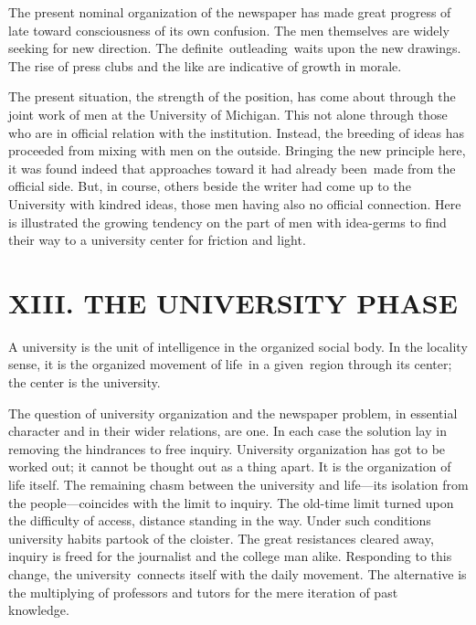 \documentclass[twoside,symmetric,nobib,justified]{tufte-book}
\begin{document}
The present nominal organization of the newspaper has made great
progress of late toward consciousness of its own confusion. The men
themselves are widely seeking for new direction. The
definite~outleading~waits upon the new drawings. The rise of press clubs
and the like are indicative of growth in morale.~

The present situation, the strength of the position, has come about
through the joint work of men at the University of Michigan. This not
alone through those who are in official relation with the institution.
Instead, the breeding of ideas has proceeded from mixing with men on the
outside. Bringing the new principle here, it was found indeed that
approaches toward it had already been~made from the official side. But,
in course, others beside the writer had come up to the University with
kindred ideas, those men having also no official connection. Here is
illustrated the growing tendency on the part of men with idea-germs to
find their way to a university center for friction and light.~

\hypertarget{xiii-the-university-phase}{%
\section{XIII. THE UNIVERSITY
PHASE}\label{xiii-the-university-phase}}

A university is the unit of intelligence in the organized social body.
In the locality sense, it is the organized movement of life~in a
given~region through its center; the center is the university.~

The question of university organization and the newspaper problem, in
essential character and in their wider relations, are one. In each case
the solution lay in removing the hindrances to free inquiry. University
organization has got to be worked out; it cannot be thought out as a
thing apart. It is the organization of life itself. The remaining chasm
between the university and life---its isolation from the
people---coincides with the limit to inquiry. The old-time limit turned
upon the difficulty of access, distance standing in the way. Under such
conditions university habits partook of the cloister. The great
resistances cleared away, inquiry is freed for the journalist and the
college man alike. Responding to this change, the university~connects
itself with the daily movement. The alternative is the multiplying of
professors and tutors for the mere iteration of past knowledge.~
\end{document}

